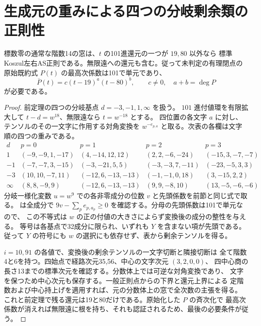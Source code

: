 \section{生成元の重みによる四つの分岐剰余類の正則性}
\label{sec:rank-fourteen-ramified-disks}
\begin{theorem}\label{thm:rank-fourteen-ramified-disks}
標数零の通常な階数14の窓は、$t$ の101進還元の一つが $19,80$ 以外なら
標準Koszul左右AS正則である。無限遠への還元も含む。従って未判定の有理閉点の
原始既約式 $P(t)$ の最高次係数は101で単元であり、
\[
 \overline{P}(t)=c(t-19)^a(t-80)^b,\qquad c\ne0,\quad a+b=\deg P
\]
が必要である。
\end{theorem}
\begin{proof}
前定理の四つの分岐基点 $d=-3,-1,1,\infty$ を扱う。
$101$ 進付値環を有限拡大して $t-d=w^{18}$、無限遠なら $t=w^{-18}$ とする。
四位置の各文字 $a$ に対し、テンソルのその一文字に作用する対角変換を
$w^{-e_{p,a}}$ と取る。次表の各欄は文字順の四つの重みである。
\[
\begin{array}{c|r|r|r|r}
d &p=0&p=1&p=2&p=3\\\hline
1&(-9,-9,1,-17)&(4,-14,12,12)&(2,2,-6,-24)&(-15,3,-7,-7)\\
-1&(-7,-7,3,-15)&(-3,-21,5,5)&(-3,-3,7,-11)&(-23,-5,3,3)\\
-3&(10,10,-7,11)&(-12,6,-13,-13)&(-1,-1,0,18)&(3,-15,2,2)\\
\infty&(8,8,-9,9)&(-12,6,-13,-13)&(9,9,-8,10)&(13,-5,-6,-6)
\end{array}
\]
分岐一様化変数 $u=w^9$ での各非零成分の位数 $v$ と先頭係数を前節と同じ式で取る。
 は全成分で
$9v-\sum_p e_{p,a_p}\ge0$ を確認する。分母の先頭係数は101で単元なので、
この不等式は $w$ の正の付値の大きさによらず変換後の成分の整性を与える。
等号は各基点で32成分に限られ、いずれも $Y$ を含まない項が先頭である。
従って $Y$ の符号にも $w$ の選択にも依存せず、表から剰余テンソルを得る。

$i=10,91$ の各値で、変換後の剰余テンソルの一文字切断と隣接切断は
全て階数4と6を持つ。四始点で経路次元35,56、中心の文字次元 $(3,2,0,0)$、
四中心商の長さ13までの標準次元を確認する。分数体上では可逆な対角変換であり、
文字を保つため中心次元も保存する。一般正則点からの下界と還元上界による
定階数および中心持上げを適用すれば、元の分数体上の窓で全次数の主張を得る。
これと前定理で残る還元は19と80だけである。原始化した $P$ の斉次化で
最高次係数が消えれば無限遠に根を持ち、それも認証されるため、最後の必要条件が従う。
\end{proof}


